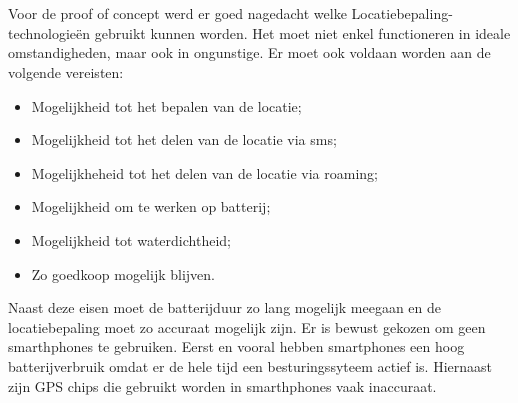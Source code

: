 \chapter{}
\label{ch:vergelijking}
Voor de proof of concept werd er goed nagedacht welke Locatiebepaling-technologieën gebruikt kunnen worden. Het moet niet enkel functioneren in ideale omstandigheden, maar ook in ongunstige. Er moet ook voldaan worden aan de volgende vereisten:
\begin{itemize}
    \item Mogelijkheid tot het bepalen van de locatie;
    \item Mogelijkheid tot het delen van de locatie via sms;
    \item Mogelijkheheid tot het delen van de locatie via roaming;
    \item Mogelijkheid om te werken op batterij;
    \item Mogelijkheid tot waterdichtheid;
    \item Zo goedkoop mogelijk blijven.
\end{itemize}
Naast deze eisen moet de batterijduur zo lang mogelijk meegaan en de locatiebepaling moet zo accuraat mogelijk zijn.
\newline
Er is bewust gekozen om geen smarthphones te gebruiken. Eerst en vooral hebben smartphones een hoog batterijverbruik omdat er de hele tijd een besturingssyteem actief is. Hiernaast zijn GPS chips die gebruikt worden in smarthphones vaak inaccuraat.
\newline
